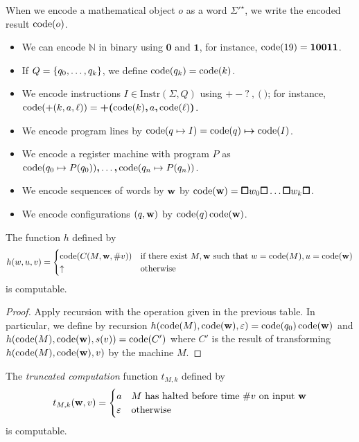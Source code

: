 When we encode a mathematical object \( o \) as a word \( \Sigma'^\star \), we write the encoded result \( \operatorname{code}(o) \).
\begin{itemize}
	\item We can encode \( \mathbb N \) in binary using \( \bm 0 \) and \( \bm 1 \), for instance, \( \operatorname{code}(19) = \bm 1 \bm 0 \bm 0 \bm 1 \bm 1 \).
	\item If \( Q = \qty{q_0, \dots, q_k} \), we define \( \operatorname{code}(q_k) = \operatorname{code}(k) \).
	\item We encode instructions \( I \in \mathrm{Instr}(\Sigma, Q) \) using \( \bm +\ \bm -\ \bm ?\ \bm ,\ \bm (\ \bm ) \); for instance, \( \operatorname{code}(+(k,a,\ell)) = \bm +\bm(\operatorname{code}(k)\bm , a\bm ,\operatorname{code}(\ell)\bm ) \).
	\item We encode program lines by \( \operatorname{code}(q \mapsto I) = \operatorname{code}(q) \bm \mapsto \operatorname{code}(I) \).
	\item We encode a register machine with program \( P \) as \( \operatorname{code}(q_0 \mapsto P(q_0)) \bm , \ldots \bm , \operatorname{code}(q_n \mapsto P(q_n)) \).
	\item We encode sequences of words by \( \vb w \) by \( \operatorname{code}(\vb w) = \bm\square w_0 \bm\square \ldots \bm\square w_k \bm\square \).
	\item We encode configurations \( (q, \vb w) \) by \( \operatorname{code}(q)\operatorname{code}(\vb w) \).
\end{itemize}
\begin{lemma}
	The function \( h \) defined by
	\[ h(w,u,v) = \begin{cases}
		\operatorname{code}(C(M,\vb w,\# v)) & \text{if there exist } M, \vb w \text{ such that } w = \operatorname{code}(M), u = \operatorname{code}(\vb w) \\
		\uparrow & \text{otherwise}
	\end{cases} \]
	is computable.
\end{lemma}
\begin{proof}
	Apply recursion with the operation given in the previous table.
	In particular, we define by recursion \( h(\operatorname{code}(M), \operatorname{code}(\vb w), \varepsilon) = \operatorname{code}(q_0)\operatorname{code}(\vb w) \) and \( h(\operatorname{code}(M), \operatorname{code}(\vb w), s(v)) = \operatorname{code}(C') \) where \( C' \) is the result of transforming \( h(\operatorname{code}(M), \operatorname{code}(\vb w), v) \) by the machine \( M \).
\end{proof}
\begin{corollary}
	The \emph{truncated computation} function \( t_{M,k} \) defined by
	\[ t_{M,k}(\vb w, v) = \begin{cases}
		a & M \text{ has halted before time } \#v \text{ on input } \vb w \\
		\varepsilon & \text{otherwise}
	\end{cases} \]
	is computable.
\end{corollary}

